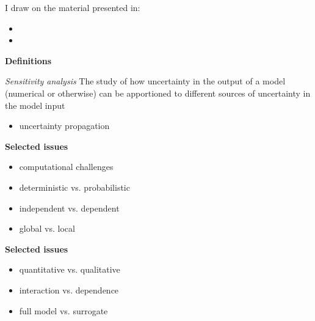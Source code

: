 \begin{frame} I draw on the material presented in:

\begin{itemize}\setlength\itemsep{1em}
  \item {}
  \item {}
\end{itemize}

\end{frame}
\begin{frame}\textbf{Definitions}\vspace{0.3cm}

\textit{Sensitivity analysis} The study of how uncertainty in the output of a model (numerical or otherwise) can be apportioned to different sources of uncertainty in the model input

\begin{itemize}
  \item uncertainty propagation
\end{itemize}
\end{frame}
\begin{frame}\textbf{Selected issues}\vspace{0.3cm}

\begin{itemize}\setlength\itemsep{1em}
  \item computational challenges
  \item deterministic vs. probabilistic
  \item independent vs. dependent
  \item global vs. local
\end{itemize}

\end{frame}
\begin{frame}\textbf{Selected issues}\vspace{0.3cm}

\begin{itemize}\setlength\itemsep{1em}
  \item quantitative vs. qualitative
  \item interaction vs. dependence
  \item full model vs. surrogate
\end{itemize}

\end{frame}
